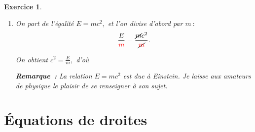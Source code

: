 \documentclass[10pt]{article}
\newtheorem{exo}{Exercice}
\begin{document}
\begin{exo}
\begin{enumerate}
Exemple~: lorsqu'une personne chute d'une hauteur de 5~m, sa vitesse à l'impact est $v=\sqrt{2gh}\approx \sqrt{2\times 9,8\times 5}\approx 9,9~\text{m/s},$ soit environ 35,6~km/h.

\item On part de l'égalité $E=mc^2,$ et l'on divise d'abord par $m~:$
\[\frac{E}{\textcolor{red}{m}}=\frac{\cancel{m} c^2}{\cancel{\textcolor{red}{m}}}.\]

On obtient $c^2=\frac{E}{m},$ d'où 

\medskip

\textbf{Remarque~:} La relation $E=mc^2$ est due à Einstein. Je laisse aux amateurs de physique le plaisir de se renseigner à son sujet.

\end{enumerate}
\end{exo}


\setcounter{section}{5}



\section{Équations de droites}




\setcounter{exo}{75}
\end{document}
